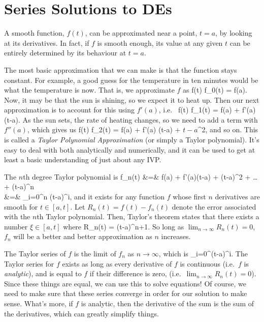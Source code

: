 \documentclass[12pt]{article}
\begin{document}
\newpage
\section{Series Solutions to DEs}

A smooth function, $f(t)$, can be approximated near a point, $t=a$, by looking at 
its derivatives. In fact, if $f$ is smooth enough, its value at any
given $t$ can be entirely determined by its behaviour at $t=a$.

The most basic approximation that we can make is that the function stays 
constant. For example, a good guess for the temperature in ten minutes would
be what the temperature is now. That is, we approximate $f$ as
\be
f(t) \approx f_0(t) = f(a).
\ee
Now, it may be that the sun is shining, so we expect it to heat up. Then our 
next approximation is to account for this using $f'(a)$, i.e.\
\be
f(t) \approx f_1(t) = f(a) + f'(a) (t-a).
\ee
As the sun sets, the rate of heating changes, so we need to add a term with
$f''(a)$, which gives us
\be
f(t) \approx f_2(t) = f(a) + f'(a) (t-a) + \(t-a\)^2,
\ee
and so on. This is called a \emph{Taylor Polynomial Approximation} (or simply a
Taylor polynomial). It's easy to deal with both analytically and numerically,
and it can be used to get at least a basic understanding of just about any IVP.

The $n$th degree Taylor polynomial is
\be
f_n(t) &=& f(a) + f'(a)(t-a) + (t-a)^2 + \dots 
+  (t-a)^n
\\ \nonumber
&=& \sum_{i=0}^n (t-a)^i,
\ee
and it exists for any function $f$ whose first $n$ derivatives are smooth for
$t\in [a,t]$. 
Let $R_n(t) = f(t) -f_n(t)$ denote the error associated with the $n$th Taylor polynomial. Then, Taylor's theorem states
that there exists a number $\xi \in [a,t]$ where
\be
R_n(t) = (t-a)^{n+1}.
\ee
So long as $\lim_{n\rightarrow \infty} R_n(t) =0$, $f_n$ will be a better and
better approximation as $n$ increases.


The Taylor series of $f$ is the limit of $f_n$ as $n\rightarrow\infty$, which is
\be
\sum_{i=0}^\infty {}(t-a)^i.
\ee
The Taylor series for $f$ exists as long as every derivative of $f$ is
continuous (i.e.\ $f$ is \emph{analytic}), and is equal to $f$ if their 
difference is zero, (i.e.\ $\lim_{n\rightarrow \infty} R_n(t) =0$). Since these 
things are equal, we can use this to solve equations! Of course, we need to 
make sure that these series converge in order for our solution to make sense.
What's more, if $f$ is analytic, then the derivative of the sum is the sum
of the derivatives, which can greatly simplify things.\\
\end{document}
